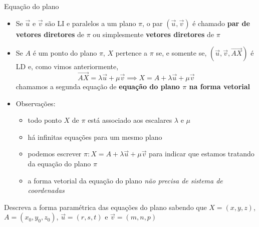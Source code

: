 \begin{frame}{Equação do plano}
    \begin{itemize}
        \item Se \(\vec{u}\) e \(\vec{v}\) são LI e paralelos a um plano \(\pi\),
            o par \((\vec{u},\vec{v})\) é chamado \textbf{par de vetores diretores}
            de \(\pi\) ou simplesmente \textbf{vetores diretores} de \(\pi\)
        \item Se \(A\) é um ponto do plano \(\pi\), \(X\) pertence a \(\pi\) se,
            e somente se, \((\vec{u},\vec{v},\vec{AX})\) é LD e, como vimos anteriormente,
            \[
                \vec{AX} = \lambda \vec{u} + \mu \vec{v} \implies X = A +\lambda \vec{u} + \mu \vec{v}
            \]
            chamamos a segunda equação de \textbf{equação do plano \(\pi\) na forma vetorial}
        \item Observações:
            \begin{itemize}
                \item todo ponto \(X\) de \(\pi\) está associado aos escalares \(\lambda\) e \(\mu\)
                \item há infinitas equações para um mesmo plano
                \item podemos escrever \(\pi: X=A+\lambda \vec{u} +\mu \vec{v}\) para indicar que estamos 
                    tratando da equação do plano \(\pi\)
                \item a forma vetorial da equação do plano \textit{não precisa de sistema de coordenadas}
            \end{itemize}
    \end{itemize}

    \begin{tcolorbox}[colback=magenta!20]
        Descreva a forma paramétrica das equações do plano sabendo que \(X=(x,y,z)\),
        \(A=(x_0,y_0,z_0)\), \(\vec{u}=(r,s,t)\) e \(\vec{v}=(m,n,p)\)
    \end{tcolorbox}
\end{frame}

